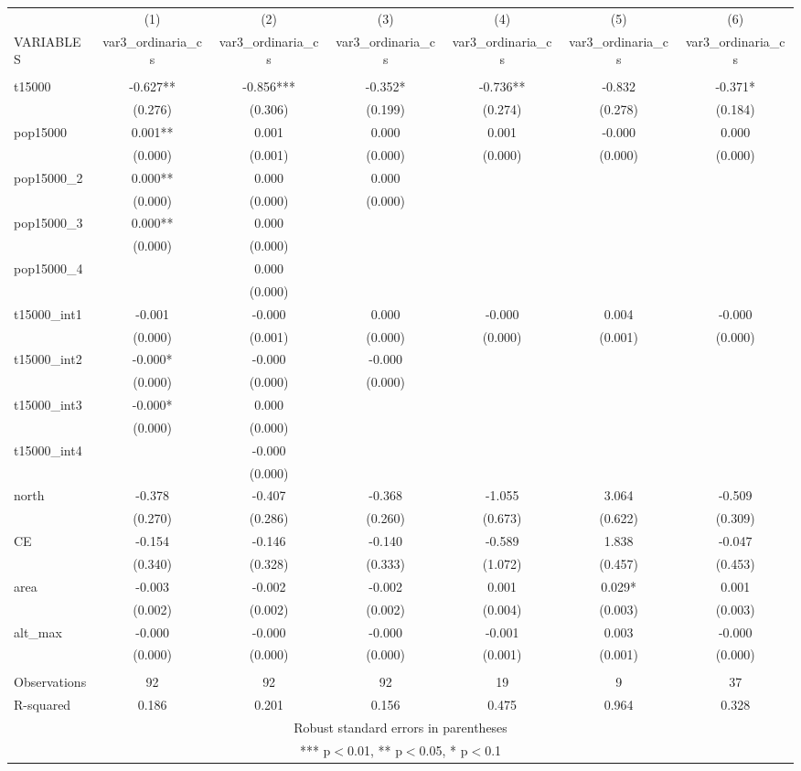 \documentclass[]{article}
\begin{document}
\begin{tabular}{lcccccc} \hline
 & (1) & (2) & (3) & (4) & (5) & (6) \\
VARIABLES & var3\_ordinaria\_cs & var3\_ordinaria\_cs & var3\_ordinaria\_cs & var3\_ordinaria\_cs & var3\_ordinaria\_cs & var3\_ordinaria\_cs \\ \hline
 &  &  &  &  &  &  \\
t15000 & -0.627** & -0.856*** & -0.352* & -0.736** & -0.832 & -0.371* \\
 & (0.276) & (0.306) & (0.199) & (0.274) & (0.278) & (0.184) \\
pop15000 & 0.001** & 0.001 & 0.000 & 0.001 & -0.000 & 0.000 \\
 & (0.000) & (0.001) & (0.000) & (0.000) & (0.000) & (0.000) \\
pop15000\_2 & 0.000** & 0.000 & 0.000 &  &  &  \\
 & (0.000) & (0.000) & (0.000) &  &  &  \\
pop15000\_3 & 0.000** & 0.000 &  &  &  &  \\
 & (0.000) & (0.000) &  &  &  &  \\
pop15000\_4 &  & 0.000 &  &  &  &  \\
 &  & (0.000) &  &  &  &  \\
t15000\_int1 & -0.001 & -0.000 & 0.000 & -0.000 & 0.004 & -0.000 \\
 & (0.000) & (0.001) & (0.000) & (0.000) & (0.001) & (0.000) \\
t15000\_int2 & -0.000* & -0.000 & -0.000 &  &  &  \\
 & (0.000) & (0.000) & (0.000) &  &  &  \\
t15000\_int3 & -0.000* & 0.000 &  &  &  &  \\
 & (0.000) & (0.000) &  &  &  &  \\
t15000\_int4 &  & -0.000 &  &  &  &  \\
 &  & (0.000) &  &  &  &  \\
north & -0.378 & -0.407 & -0.368 & -1.055 & 3.064 & -0.509 \\
 & (0.270) & (0.286) & (0.260) & (0.673) & (0.622) & (0.309) \\
CE & -0.154 & -0.146 & -0.140 & -0.589 & 1.838 & -0.047 \\
 & (0.340) & (0.328) & (0.333) & (1.072) & (0.457) & (0.453) \\
area & -0.003 & -0.002 & -0.002 & 0.001 & 0.029* & 0.001 \\
 & (0.002) & (0.002) & (0.002) & (0.004) & (0.003) & (0.003) \\
alt\_max & -0.000 & -0.000 & -0.000 & -0.001 & 0.003 & -0.000 \\
 & (0.000) & (0.000) & (0.000) & (0.001) & (0.001) & (0.000) \\
 &  &  &  &  &  &  \\
Observations & 92 & 92 & 92 & 19 & 9 & 37 \\
 R-squared & 0.186 & 0.201 & 0.156 & 0.475 & 0.964 & 0.328 \\ \hline
\multicolumn{7}{c}{ Robust standard errors in parentheses} \\
\multicolumn{7}{c}{ *** p$<$0.01, ** p$<$0.05, * p$<$0.1} \\
\end{tabular}
\end{document}
